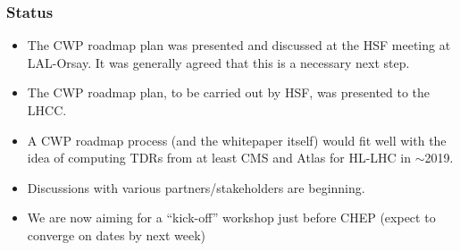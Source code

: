 \begin{frame}
\frametitle{Status}

\begin{itemize}
\item The CWP roadmap plan was presented and discussed at the HSF meeting at LAL-Orsay. It was generally agreed that this is a necessary next step.
\item The CWP roadmap plan, to be carried out by HSF, was presented to the LHCC.
\item A CWP roadmap process (and the whitepaper itself) would fit well with the idea of computing TDRs from at least CMS and Atlas for HL-LHC in $\sim$2019.
\item Discussions with various partners/stakeholders are beginning.
\item We are now aiming for a ``kick-off'' workshop just before CHEP (expect to converge on dates by next week)
\end{itemize}

\end{frame}


